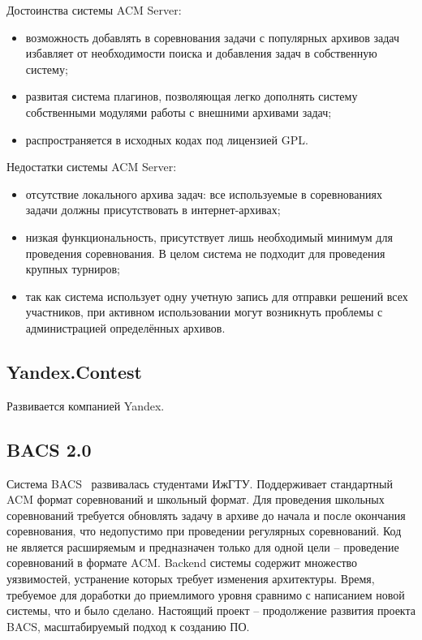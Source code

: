 Достоинства системы ACM Server:
\begin{itemize}
    \item возможность добавлять в соревнования задачи с популярных архивов задач
        избавляет от необходимости поиска и добавления задач в собственную систему;
    \item развитая система плагинов, позволяющая легко дополнять систему
        собственными модулями работы с внешними архивами задач;
    \item распространяется в исходных кодах под лицензией GPL.
\end{itemize}

Недостатки системы ACM Server:
\begin{itemize}
    \item отсутствие локального архива задач:
        все используемые в соревнованиях задачи должны присутствовать в интернет-архивах;
    \item низкая функциональность, присутствует лишь необходимый минимум для проведения соревнования.
        В целом система не подходит для проведения крупных турниров;
    \item так как система использует одну учетную запись для отправки решений всех участников,
        при активном использовании могут возникнуть проблемы с администрацией определённых архивов.
\end{itemize}

\subsection{Yandex.Contest}
Развивается компанией Yandex.

\subsection{BACS 2.0}
Система BACS~\cite{bacs2} развивалась студентами ИжГТУ.
Поддерживает стандартный ACM формат соревнований и школьный формат.
Для проведения школьных соревнований требуется обновлять задачу в архиве до начала и после окончания соревнования,
что недопустимо при проведении регулярных соревнований.
Код не является расширяемым и предназначен только для одной цели -- проведение соревнований в формате ACM.
Backend системы содержит множество уязвимостей, устранение которых требует изменения архитектуры.
Время, требуемое для доработки до приемлимого уровня сравнимо с написанием новой системы, что и было сделано.
Настоящий проект -- продолжение развития проекта BACS, масштабируемый подход к созданию ПО.
